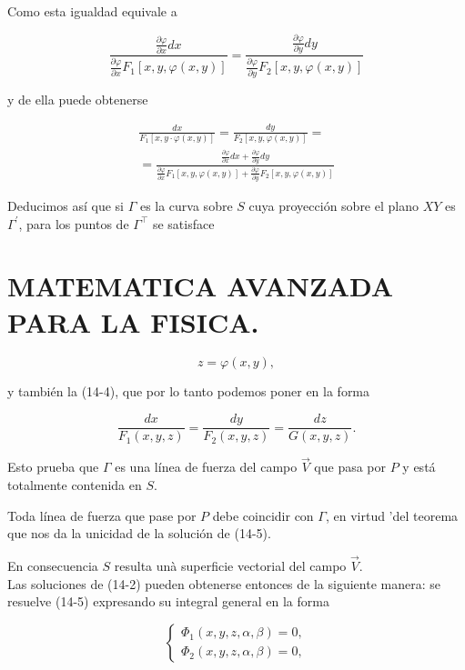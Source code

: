 \documentclass[10pt]{article}
\theoremstyle{plain}
\theoremstyle{definition}
\theoremstyle{remark}
\begin{document}
Como esta igualdad equivale a

$$
\frac{\frac{\partial \varphi}{\partial x} d x}{\frac{\partial \varphi}{\partial x} F_{1}[x, y, \varphi(x, y)]}=\frac{\frac{\partial \varphi}{\partial y} d y}{\frac{\partial \varphi}{\partial y} F_{2}[x, y, \varphi(x, y)]}
$$

y de ella puede obtenerse


\begin{gather*}
\frac{d x}{F_{1}[x, y \cdot \varphi(x, y)]}=\frac{d y}{F_{2}[x, y, \varphi(x, y)]}= \\
=\frac{\frac{\partial \varphi}{\partial x} d x+\frac{\partial \varphi}{\partial y} d y}{\frac{\partial \varphi}{\partial x} F_{1}[x, y, \varphi(x, y)]+\frac{\partial \varphi}{\partial y} F_{2}[x, y, \varphi(x, y)]} \tag{14-4}
\end{gather*}


Deducimos así que si $\Gamma$ es la curva sobre $S$ cuya proyección sobre el plano $X Y$ es $\Gamma^{\prime}$, para los puntos de $\Gamma^{\top}$ se satisface

\section*{MATEMATICA AVANZADA PARA LA FISICA.}
$$
z=\varphi(x, y),
$$

y también la (14-4), que por lo tanto podemos poner en la forma


\begin{equation*}
\frac{d x}{F_{1}(x, y, z)}=\frac{d y}{F_{2}(x, y, z)}=\frac{d z}{G(x, y, z)} . \tag{14.5}
\end{equation*}


Esto prueba que $\Gamma$ es una línea de fuerza del campo $\vec{V}$ que pasa por $P$ y está totalmente contenida en $S$.

Toda línea de fuerza que pase por $P$ debe coincidir con $\Gamma$, en virtud 'del teorema que nos da la unicidad de la solución de (14-5).

En consecuencia $S$ resulta unà superficie vectorial del campo $\vec{V}$.\\
Las soluciones de (14-2) pueden obtenerse entonces de la siguiente manera: se resuelve (14-5) expresando su integral general en la forma

\[
\left\{\begin{array}{l}
\Phi_{1}(x, y, z, \alpha, \beta)=0,  \tag{14-6}\\
\Phi_{2}(x, y, z, \alpha, \beta)=0,
\end{array}\right.
\]
\end{document}
